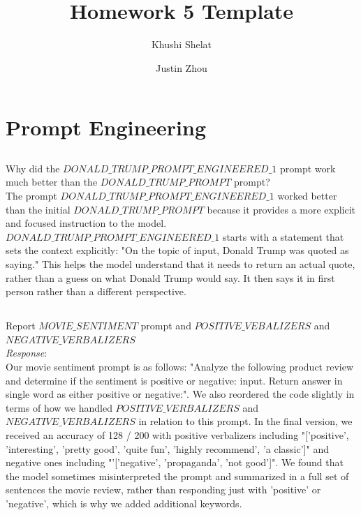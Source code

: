 \documentclass{article}
\title{Homework 5 Template}
\author{Khushi Shelat  \and Justin Zhou}
\date{}
\begin{document}
\maketitle
\thispagestyle{empty}
\pagestyle{empty}

\section{Prompt Engineering}
\subsection{}
Why did the $DONALD\_TRUMP\_PROMPT\_ENGINEERED\_1$ prompt work much better than the $DONALD\_TRUMP\_PROMPT$ prompt?\\ 

The prompt $DONALD\_TRUMP\_PROMPT\_ENGINEERED\_1$ worked better than the initial $DONALD\_TRUMP\_PROMPT$ because it provides a more explicit and focused instruction to the model. $DONALD\_TRUMP\_PROMPT\_ENGINEERED\_1$ starts with a statement that sets the context explicitly: "On the topic of {input}, Donald Trump was quoted as saying." This helps the model understand that it needs to return an actual quote, rather than a guess on what Donald Trump would say. It then says it in first person rather than a different perspective. 

\subsection{}


Report $MOVIE\_SENTIMENT$ prompt and $POSITIVE\_VEBALIZERS$ and\\ $NEGATIVE\_VERBALIZERS$\\
\emph{Response}: \\ 

Our movie sentiment prompt is as follows: "Analyze the following product review and determine if the sentiment is positive or negative: {input}. Return answer in single word as either positive or negative:". We also reordered the code slightly in terms of how we handled $POSITIVE\_VERBALIZERS$ and $NEGATIVE\_VERBALIZERS$ in relation to this prompt. In the final version, we received an accuracy of 128 / 200 with positive verbalizers including "['positive', 'interesting', 'pretty good', 'quite fun', 'highly recommend', 'a classic']" and negative ones including "'['negative', 'propaganda', 'not good']". We found that the model sometimes misinterpreted the prompt and summarized in a full set of sentences the movie review, rather than responding just with 'positive' or 'negative', which is why we added additional keywords. 
\end{document}
